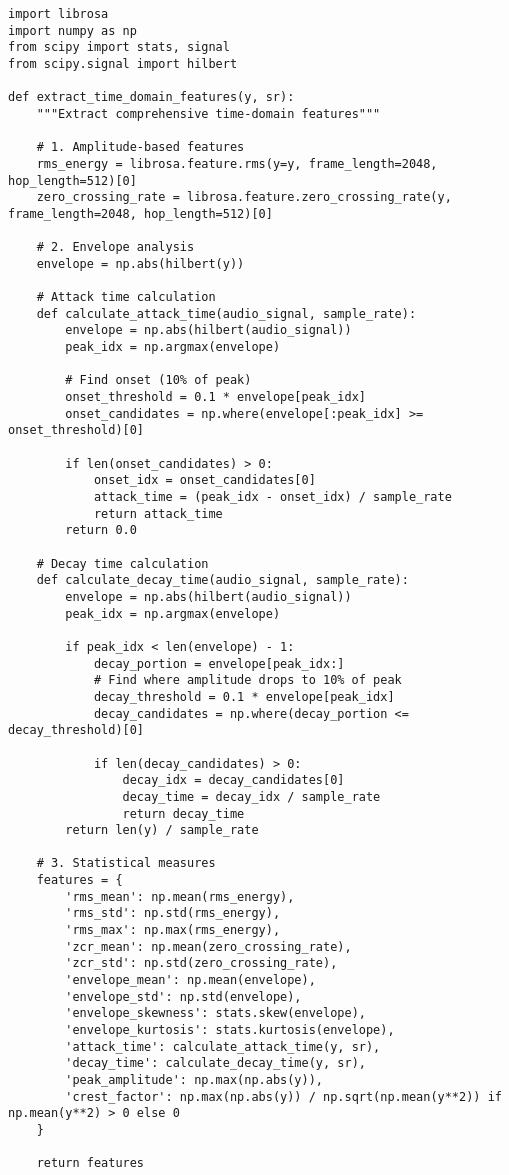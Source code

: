 \documentclass[12pt]{article}
\begin{document}
\begin{verbatim}
import librosa
import numpy as np
from scipy import stats, signal
from scipy.signal import hilbert

def extract_time_domain_features(y, sr):
    """Extract comprehensive time-domain features"""
    
    # 1. Amplitude-based features
    rms_energy = librosa.feature.rms(y=y, frame_length=2048, hop_length=512)[0]
    zero_crossing_rate = librosa.feature.zero_crossing_rate(y, frame_length=2048, hop_length=512)[0]
    
    # 2. Envelope analysis
    envelope = np.abs(hilbert(y))
    
    # Attack time calculation
    def calculate_attack_time(audio_signal, sample_rate):
        envelope = np.abs(hilbert(audio_signal))
        peak_idx = np.argmax(envelope)
        
        # Find onset (10% of peak)
        onset_threshold = 0.1 * envelope[peak_idx]
        onset_candidates = np.where(envelope[:peak_idx] >= onset_threshold)[0]
        
        if len(onset_candidates) > 0:
            onset_idx = onset_candidates[0]
            attack_time = (peak_idx - onset_idx) / sample_rate
            return attack_time
        return 0.0
    
    # Decay time calculation
    def calculate_decay_time(audio_signal, sample_rate):
        envelope = np.abs(hilbert(audio_signal))
        peak_idx = np.argmax(envelope)
        
        if peak_idx < len(envelope) - 1:
            decay_portion = envelope[peak_idx:]
            # Find where amplitude drops to 10% of peak
            decay_threshold = 0.1 * envelope[peak_idx]
            decay_candidates = np.where(decay_portion <= decay_threshold)[0]
            
            if len(decay_candidates) > 0:
                decay_idx = decay_candidates[0]
                decay_time = decay_idx / sample_rate
                return decay_time
        return len(y) / sample_rate
    
    # 3. Statistical measures
    features = {
        'rms_mean': np.mean(rms_energy),
        'rms_std': np.std(rms_energy),
        'rms_max': np.max(rms_energy),
        'zcr_mean': np.mean(zero_crossing_rate),
        'zcr_std': np.std(zero_crossing_rate),
        'envelope_mean': np.mean(envelope),
        'envelope_std': np.std(envelope),
        'envelope_skewness': stats.skew(envelope),
        'envelope_kurtosis': stats.kurtosis(envelope),
        'attack_time': calculate_attack_time(y, sr),
        'decay_time': calculate_decay_time(y, sr),
        'peak_amplitude': np.max(np.abs(y)),
        'crest_factor': np.max(np.abs(y)) / np.sqrt(np.mean(y**2)) if np.mean(y**2) > 0 else 0
    }
    
    return features
\end{verbatim}
\end{document}

